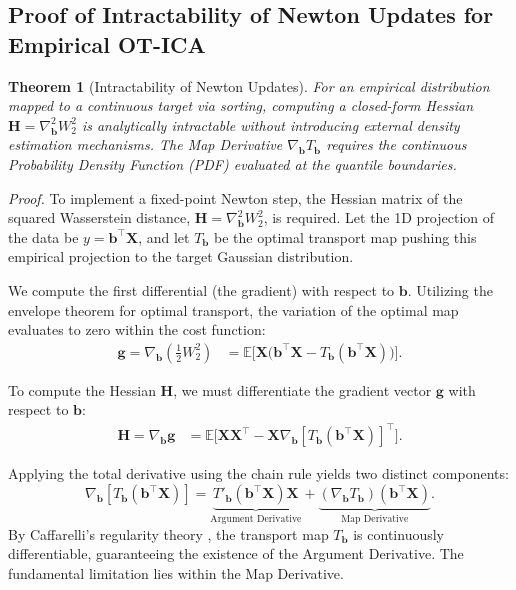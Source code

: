 \documentclass{tpm2026} %
\newtheorem{theorem}{Theorem}
\begin{document}
\subsection{Proof of Intractability of Newton Updates for Empirical OT-ICA}
\label{app:intractability}
\begin{theorem}[Intractability of Newton Updates]
For an empirical distribution mapped to a continuous target via sorting, computing a closed-form Hessian $\mathbf{H} = \nabla^2_{\mathbf{b}} W_2^2$ is 
analytically intractable without introducing external density estimation mechanisms. The Map Derivative $\nabla_{\mathbf{b}} T_{\mathbf{b}}$  
requires the continuous Probability Density Function (PDF) evaluated at the quantile boundaries.
\end{theorem}

\textit{Proof.} To implement a fixed-point Newton step, the Hessian matrix of the squared Wasserstein distance, $\mathbf{H} = \nabla^2_{\mathbf{b}} W_2^2$, is required. 
Let the 1D projection of the data be $y = \mathbf{b}^\top \mathbf{X}$, and let $T_{\mathbf{b}}$ be the optimal transport map pushing 
this empirical projection to the target Gaussian distribution. 

We compute the first differential (the gradient) with respect to $\mathbf{b}$. Utilizing the envelope theorem for optimal transport, 
the variation of the optimal map evaluates to zero within the cost function:
\begin{align}
    \mathbf{g} = \nabla_{\mathbf{b}} \left( \frac{1}{2} W_2^2 \right) &= \mathbb{E}\Big[ \mathbf{X} \big( \mathbf{b}^\top \mathbf{X} - T_{\mathbf{b}}(\mathbf{b}^\top \mathbf{X}) \big) \Big].
\end{align}

To compute the Hessian $\mathbf{H}$, we must differentiate the gradient vector $\mathbf{g}$ with respect to $\mathbf{b}$:
\begin{align}
    \mathbf{H} = \nabla_{\mathbf{b}} \mathbf{g} &= \mathbb{E}\Big[ \mathbf{X} \mathbf{X}^\top - \mathbf{X} \nabla_{\mathbf{b}} [T_{\mathbf{b}}(\mathbf{b}^\top \mathbf{X})]^\top \Big].
\end{align}

Applying the total derivative using the chain rule yields two distinct components:
\begin{equation}
    \nabla_{\mathbf{b}} [T_{\mathbf{b}}(\mathbf{b}^\top \mathbf{X})] = \underbrace{T'_{\mathbf{b}}(\mathbf{b}^\top \mathbf{X}) \mathbf{X}}_{\text{Argument Derivative}} + \underbrace{(\nabla_{\mathbf{b}} T_{\mathbf{b}})(\mathbf{b}^\top \mathbf{X})}_{\text{Map Derivative}}.
\end{equation}
By Caffarelli's regularity theory \citep{caffarelli1992}, the transport map $T_{\mathbf{b}}$ is continuously differentiable, 
guaranteeing the existence of the Argument Derivative. The fundamental limitation lies within the Map Derivative. 
\end{document}
